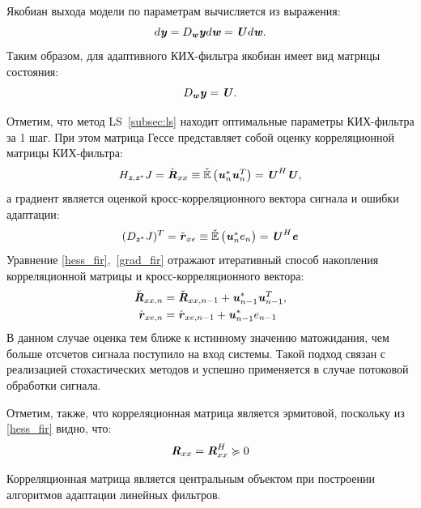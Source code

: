 Якобиан выхода модели по параметрам вычисляется из выражения:
\begin{equation}
	d\textbf{\textit{y}}=D_{\textbf{\textit{w}}}\textbf{\textit{y}}d\textbf{\textit{w}}=\textbf{\textit{U}}d\textbf{\textit{w}}.
	\label{different_fir}
\end{equation}
Таким образом, для адаптивного КИХ-фильтра якобиан имеет вид матрицы состояния:
\begin{equation}
	D_{\textbf{\textit{w}}}\textbf{\textit{y}}=\textbf{\textit{U}}.
	\label{jacobian_fir}
\end{equation}

Отметим, что метод LS~\ref{subsec:ls} находит оптимальные параметры КИХ-фильтра за 1 шаг. При этом матрица Гессе представляет собой оценку корреляционной матрицы КИХ-фильтра:
\begin{equation}
	H_{\textbf{\textit{z}}, \textbf{\textit{z}}^*}J=\check{\textbf{\textit{R}}}_{xx}\equiv\check{\mathbb{E}}
	\begin{pmatrix}
		\textbf{\textit{u}}_n^{*}
		\textbf{\textit{u}}_n^{T}
	\end{pmatrix}=\textbf{\textit{U}}^{H}\textbf{\textit{U}},
	\label{hess_fir}
\end{equation}
а градиент является оценкой кросс-корреляционного вектора сигнала и ошибки адаптации:
\begin{equation}
	(D_{\textbf{\textit{z}}^*}J)^T=\check{\textbf{\textit{r}}}_{xe}\equiv\check{\mathbb{E}}
	\begin{pmatrix}
		\textbf{\textit{u}}_n^{*}
		e_n
	\end{pmatrix}=\textbf{\textit{U}}^H\textbf{\textit{e}}
	\label{grad_fir}
\end{equation}
Уравнение \eqref{hess_fir},~\eqref{grad_fir} отражают итеративный способ накопления корреляционной матрицы и кросс-корреляционного вектора: 
\begin{align}
	\check{\textbf{\textit{R}}}_{xx,n}&=
	\check{\textbf{\textit{R}}}_{xx,n-1}+
	\textbf{\textit{u}}_{n-1}^{*}
	\textbf{\textit{u}}_{n-1}^{T}, \\
	\check{\textbf{\textit{r}}}_{xe,n}&=
	\check{\textbf{\textit{r}}}_{xe,n-1}+
	\textbf{\textit{u}}_{n-1}^{*}
	e_{n-1}
\end{align}
В данном случае оценка тем ближе к истинному значению матожидания, чем больше отсчетов сигнала поступило на вход системы. Такой подход связан с реализацией стохастических методов и успешно применяется в случае потоковой обработки сигнала. 

Отметим, также, что корреляционная матрица является эрмитовой, поскольку из \eqref{hess_fir} видно, что:
\begin{equation}
	\textbf{\textit{R}}_{xx}=\textbf{\textit{R}}_{xx}^H\succcurlyeq 0
\end{equation}

Корреляционная матрица \cite{adapt_filt_haykin} является центральным объектом при построении алгоритмов адаптации линейных фильтров.

